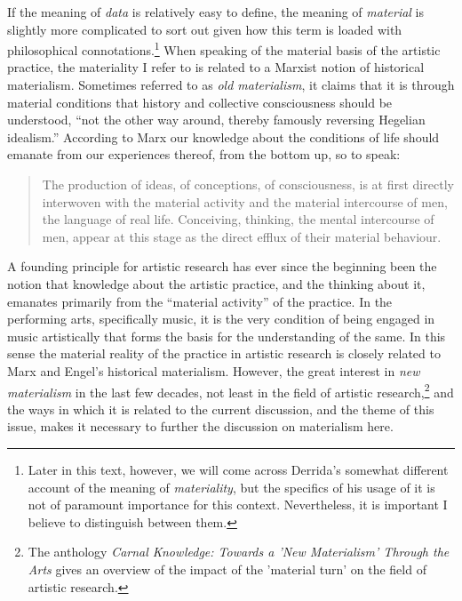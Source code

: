 \documentclass[11pt,a4paper]{article}
\begin{document}
If the meaning of \emph{data} is relatively easy to define, the meaning of \emph{material} is slightly more complicated to sort out given how this term is loaded with philosophical connotations.\footnote{Later in this text, however, we will come across Derrida's somewhat different account of the meaning of \emph{materiality}, but the specifics of his usage of it is not of paramount importance for this context. Nevertheless, it is important I believe to distinguish between them.}
When speaking of the material basis of the artistic practice, the materiality I refer to is related to a Marxist notion of historical materialism. Sometimes referred to as \emph{old materialism}, it claims that it is through material conditions that history and collective consciousness should be understood, ``not the other way around, thereby famously reversing Hegelian idealism.'' \citep[p. 25]{beetz2016} According to Marx our knowledge about the conditions of life should emanate from our experiences thereof, from the bottom up, so to speak:
\begin{quote}
  The production of ideas, of conceptions, of consciousness, is at first directly interwoven with the material activity and the material intercourse of men, the language of real life. Conceiving, thinking, the mental intercourse of men, appear at this stage as the direct efflux of their material behaviour. \citep[p. 47]{marx1970}
\end{quote}
A founding principle for artistic research has ever since the beginning been the notion that knowledge about the artistic practice, and the thinking about it, emanates primarily from the ``material activity'' of the practice. In the performing arts, specifically music, it is the very condition of being engaged in music artistically that forms the basis for the understanding of the same. In this sense the material reality of the practice in artistic research is closely related to Marx and Engel's historical materialism. However, the great interest in \emph{new materialism} in the last few decades, not least in the field of artistic research,\footnote{The anthology \emph{Carnal Knowledge: Towards a 'New Materialism' Through the Arts} \citep{barrett2013} gives an overview of the impact of the 'material turn' on the field of artistic research.} and the ways in which it is related to the current discussion, and the theme of this issue, makes it necessary to further the discussion on materialism here.
\end{document}
